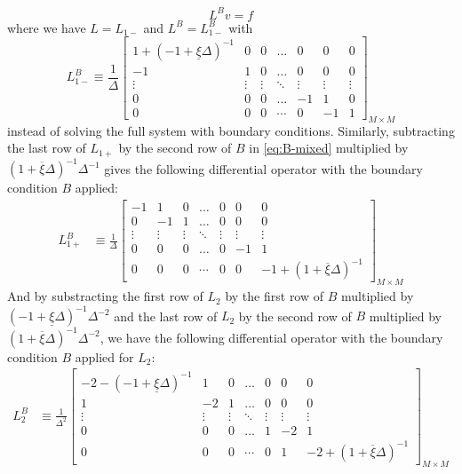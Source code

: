 \documentclass[11pt]{article}
\theoremstyle{definition}
\begin{document}
\begin{equation}\label{eq:system-on-interior}
L^B v = f
\end{equation}
where we have ${L} = {L}_{1-}$ and $L^B = L_{1-}^B$ with
\begin{equation}
L_{1-}^B \equiv \frac{1}{\Delta}\begin{bmatrix}
1 + (-1 + \underline{\xi} \Delta)^{-1} &0&0&\dots&0&0&0\\
-1&1&0&\dots&0&0&0\\
\vdots&\vdots&\vdots&\ddots&\vdots&\vdots&\vdots\\
0&0&0&\dots&-1&1&0\\
0&0&0&\cdots&0&-1&1
\end{bmatrix}_{M\times M} \label{eq:L-1-regular}
\end{equation}
instead of solving the full system with boundary conditions. Similarly, subtracting the last row of $L_{1+}$ by the second row of $B$ in \eqref{eq:B-mixed} multiplied by $(1 + \overline{\xi} \Delta )^{-1} \Delta^{-1}$ gives the following differential operator with the boundary condition $B$ applied:
\begin{align}
L_{1+}^B &\equiv \frac{1}{\Delta}\begin{bmatrix}
-1&1&0&\dots&0&0&0\\
0&-1&1&\dots&0&0&0\\
\vdots&\vdots&\vdots&\ddots&\vdots&\vdots&\vdots\\
0&0&0&\dots&0&-1&1\\
0&0&0&\cdots&0&0&-1+(1+\overline{\xi} \Delta)^{-1}
\end{bmatrix}_{M\times M}\label{eq:L-1-plus-regular}
\end{align}
And by substracting the first row of $L_2$ by the first row of $B$ multiplied by $(-1 + \underline{\xi} \Delta )^{-1} \Delta^{-2}$ and the last row of $L_2$ by the second row of $B$ multiplied by $(1 + \overline{\xi} \Delta)^{-1} \Delta^{-2}$, we have the following differential operator with the boundary condition $B$ applied for $L_2$:
\begin{align}
L_2^B &\equiv \frac{1}{\Delta^2}\begin{bmatrix}
-2 - (-1 + \underline{\xi}\Delta)^{-1} &1&0&\dots&0&0&0\\
1&-2&1&\dots&0&0&0\\
\vdots&\vdots&\vdots&\ddots&\vdots&\vdots&\vdots\\
0&0&0&\dots&1&-2&1\\
0&0&0&\cdots&0&1&-2 +(1+ \overline{\xi}\Delta)^{-1}
\end{bmatrix}_{M\times M}\label{eq:L-2-regular}
\end{align}
\end{document}
